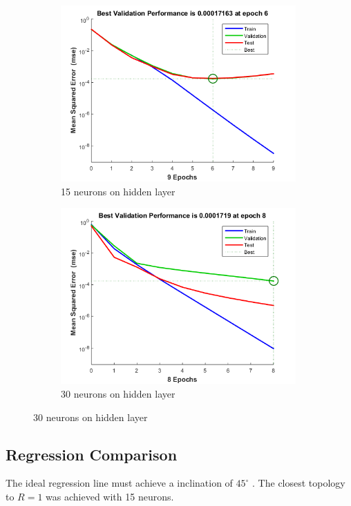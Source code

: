 \documentclass[12pt]{article}
\begin{document}
\begin{figure}[H]
	\begin{subfigure}{9cm}
	\centering\includegraphics[width=9cm]{images/perf15_1.png}
	\caption{15 neurons on hidden layer}
	\end{subfigure}%
	\begin{subfigure}{9cm}
	\centering\includegraphics[width=9cm]{images/perf30_1.png}
	\caption{30 neurons on hidden layer}
	\end{subfigure}
	\end{figure}





\newpage
	\subsection{Regression Comparison}
	The ideal regression line must achieve a inclination of $45^{\circ}$ . The closest topology to $R = 1$ was achieved with 15 neurons.
\end{document}
